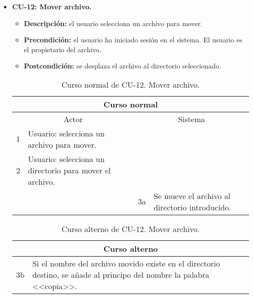 \begin{itemize}
	\item \textbf{CU-12: Mover archivo.}
	\begin{itemize}
		\item \textbf{Descripción:} el usuario selecciona un archivo para mover.
		\item \textbf{Precondición:} el usuario ha iniciado sesión en el sistema. El usuario es el propietario del archivo.
		\item \textbf{Postcondición:} se desplaza el archivo al directorio seleccionado.
	\end{itemize}
	\begin{table}[H]
		\centering
		\begin{tabular}{|p{0.3cm}|p{5cm}|p{0.3cm}|p{5cm}|}
			\hline
			\multicolumn{4}{|c|}{Curso normal} \\ \hline
			\multicolumn{2}{|c|}{Actor} & \multicolumn{2}{|c|}{Sistema} \\ \hline
			1 & Usuario: selecciona un archivo para mover. &  &  \\ \hline
			2 & Usuario: selecciona un directorio para mover el archivo. &  &  \\ \hline
			&  & 3a & Se mueve el archivo al directorio introducido. \\ \hline
		\end{tabular}
		\caption{Curso normal de CU-12. Mover archivo.}
		\label{tabla:cu12-normal}
	\end{table}
	
	\begin{table}[H]
		\centering
		\begin{tabular}{|p{0.3cm}|p{10cm}|}
			\hline
			\multicolumn{2}{|c|}{Curso alterno} \\ \hline
			3b & Si el nombre del archivo movido existe en el directorio destino, se añade al principo del nombre la palabra <<copia>>. \\ \hline
		\end{tabular}
		\caption{Curso alterno de CU-12. Mover archivo.}
		\label{tabla:cu12-alterno}
	\end{table}
\end{itemize}

